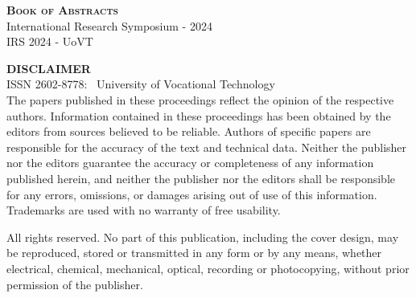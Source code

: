   \restoregeometry
        \setcounter{page}{1}


\vspace*{1cm}
\begin{center}
    \LARGE{\textsc{\textbf{Book of Abstracts}}}\\ \vspace{1cm}
    \Large{International Research Symposium - 2024}\\ \vspace{0.5cm}
    IRS 2024 - UoVT
\end{center}
\vspace{1cm}
\textbf{DISCLAIMER}\\

ISSN 2602-8778: \textcopyright \, University of Vocational Technology\\


The papers published in these proceedings reflect the opinion of the respective authors.
Information contained in these proceedings has been obtained by the editors from sources
believed to be reliable. Authors of specific papers are responsible for the accuracy of the text
and technical data. Neither the publisher nor the editors guarantee the accuracy or completeness
of any information published herein, and neither the publisher nor the editors shall be
responsible for any errors, omissions, or damages arising out of use of this information.
Trademarks are used with no warranty of free usability.

All rights reserved. No part of this publication, including the cover design, may be reproduced,
stored or transmitted in any form or by any means, whether electrical, chemical, mechanical,
optical, recording or photocopying, without prior permission of the publisher.



\newpage